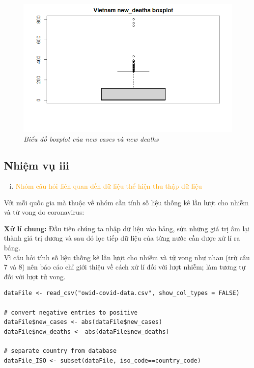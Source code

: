 \documentclass[a4paper]{article}
\theoremstyle{definition}
\begin{document}
\begin{enumerate}[1)]
\begin{figure}[H]
\begin{center}
            \includegraphics[scale=0.4]{ii/vietnam box deaths.png}
        \end{center}
        \vspace{+3mm}\caption{\it Biểu đồ boxplot của new cases và new deaths}
    \end{figure}
\end{enumerate}










\subsection{Nhiệm vụ iii}
\begin{enumerate}[iii)]
\item \textcolor{orange}{Nhóm câu hỏi liên quan đến dữ liệu thể hiện thu thập dữ liệu}
\end{enumerate}

Với mỗi quốc gia mà thuộc về nhóm cần tính số liệu thống kê lần lượt cho nhiễm và tử vong do coronavirus:

\textbf{Xử lí chung:} Đầu tiên chúng ta nhập dữ liệu vào bảng, sửa những giá trị âm lại thành giá trị dương và sau đó lọc tiếp dữ liệu của từng nước cần được xử lí ra bảng.\\
Vì câu hỏi tính số liệu thống kê lần lượt cho nhiễm và tử vong như nhau (trừ câu 7 và 8) nên báo cáo chỉ giới thiệu về cách xử lí đối với lượt nhiễm; làm tương tự đối với lượt tử vong.

\begin{lstlisting}
dataFile <- read_csv("owid-covid-data.csv", show_col_types = FALSE)
  
# convert negative entries to positive
dataFile$new_cases <- abs(dataFile$new_cases)
dataFile$new_deaths <- abs(dataFile$new_deaths)
  
# separate country from database
dataFile_ISO <- subset(dataFile, iso_code==country_code)
\end{lstlisting}
\end{document}
